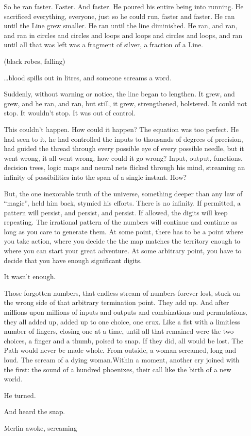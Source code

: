 So he ran faster. Faster. And faster. He poured his entire being into running. He sacrificed everything, everyone, just so he could run, faster and faster. He ran until the Line grew smaller. He ran until the line diminished. He ran, and ran, and ran in circles and circles and loops and loops and circles and loops, and ran until all that was left was a fragment of silver, a fraction of a Line.

(black robes, falling)

…blood spills out in litres, and someone screams a word.

Suddenly, without warning or notice, the line began to lengthen. It grew, and grew, and he ran, and ran, but still, it grew, strengthened, bolstered. It could not stop. It wouldn’t stop. It was out of control.

This couldn’t happen. How could it happen? The equation was too perfect. He had seen to it, he had controlled the inputs to thousands of degrees of precision, had guided the thread through every possible eye of every possible needle, but it went wrong, it all went wrong, how could it go wrong? Input, output, functions, decision trees, logic maps and neural nets flicked through his mind, streaming an infinity of possibilities into the span of a single instant. How?

But, the one inexorable truth of the universe, something deeper than any law of “magic”, held him back, stymied his efforts. There is no infinity. If permitted, a pattern will persist, and persist, and persist. If allowed, the digits will keep repeating. The irrational pattern of the numbers will continue and continue as long as you care to generate them. At some point, there has to be a point where you take action, where you decide the the map matches the territory enough to where you can start your great adventure. At some arbitrary point, you have to decide that you have enough significant digits.

It wasn’t enough.

Those forgotten numbers, that endless stream of numbers forever lost, stuck on the wrong side of that arbitrary termination point. They add up. And after millions upon millions of inputs and outputs and combinations and permutations, they all added up, added up to one choice, one crux. Like a fist with a limitless number of fingers, closing one at a time, until all that remained were the two choices, a finger and a thumb, poised to snap. If they did, all would be lost. The Path would never be made whole. From outside, a woman screamed, long and loud. The scream of a dying woman.Within a moment, another cry joined with the first: the sound of a hundred phoenixes, their call like the birth of a new world.

He turned.

And heard the snap.

Merlin awoke, screaming

